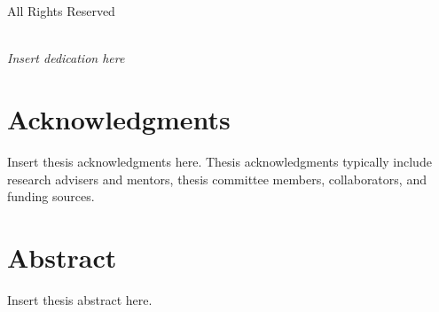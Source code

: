 
\pagestyle{plain}

\begingroup
\centering
{}
\null
\vfill
{\normalfont\textcopyright}~\Year
\\[0.5em]
\AuthorName
\\[0.5em]
All Rights Reserved
\par
\endgroup

\clearpage


\begingroup
\centering
{}
~
\\[1in]
\textit{Insert dedication here}
\par
\endgroup

\clearpage


\chapter*{Acknowledgments}

{\color{red}%
Insert thesis acknowledgments here.
Thesis acknowledgments typically include research advisers and mentors, thesis committee members, collaborators, and funding sources.}
\lipsum[1-2]

\clearpage


\chapter*{Abstract}

{\color{red}%
Insert thesis abstract here.
}
\lipsum[1]

\clearpage


\tableofcontents

\listoffigures

\listoftables

\clearpage
